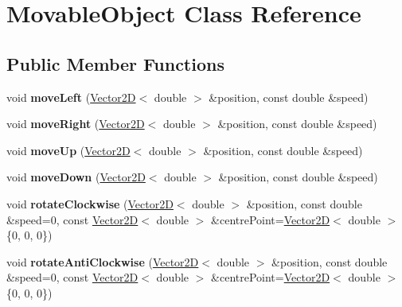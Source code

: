 \hypertarget{class_movable_object}{}\section{Movable\+Object Class Reference}
\label{class_movable_object}
\subsection*{Public Member Functions}
\begin{DoxyCompactItemize}
\item 
\mbox{\label{class_movable_object_ad3d263c971f108ba50ca91964d0f95c9}} 
void {\bfseries move\+Left} (\hyperlink{class_vector2_d}{Vector2D}$<$ double $>$ \&position, const double \&speed)
\item 
\mbox{\label{class_movable_object_abf394f36fe34e72b2d5429200322dcd3}} 
void {\bfseries move\+Right} (\hyperlink{class_vector2_d}{Vector2D}$<$ double $>$ \&position, const double \&speed)
\item 
\mbox{\label{class_movable_object_ab3d6e419088186dad6317fc42a5934d6}} 
void {\bfseries move\+Up} (\hyperlink{class_vector2_d}{Vector2D}$<$ double $>$ \&position, const double \&speed)
\item 
\mbox{\label{class_movable_object_aae1ca96738371bdc8c8a939ff5ba78df}} 
void {\bfseries move\+Down} (\hyperlink{class_vector2_d}{Vector2D}$<$ double $>$ \&position, const double \&speed)
\item 
\mbox{\label{class_movable_object_aca1c3a24e015186c34d095440bcf8fbd}} 
void {\bfseries rotate\+Clockwise} (\hyperlink{class_vector2_d}{Vector2D}$<$ double $>$ \&position, const double \&speed=0, const \hyperlink{class_vector2_d}{Vector2D}$<$ double $>$ \&centre\+Point=\hyperlink{class_vector2_d}{Vector2D}$<$ double $>$ \{0, 0, 0\})
\item 
\mbox{\label{class_movable_object_add2f871fe76fa6ef6c369162fbb002fc}} 
void {\bfseries rotate\+Anti\+Clockwise} (\hyperlink{class_vector2_d}{Vector2D}$<$ double $>$ \&position, const double \&speed=0, const \hyperlink{class_vector2_d}{Vector2D}$<$ double $>$ \&centre\+Point=\hyperlink{class_vector2_d}{Vector2D}$<$ double $>$ \{0, 0, 0\})

\end{DoxyCompactItemize}
